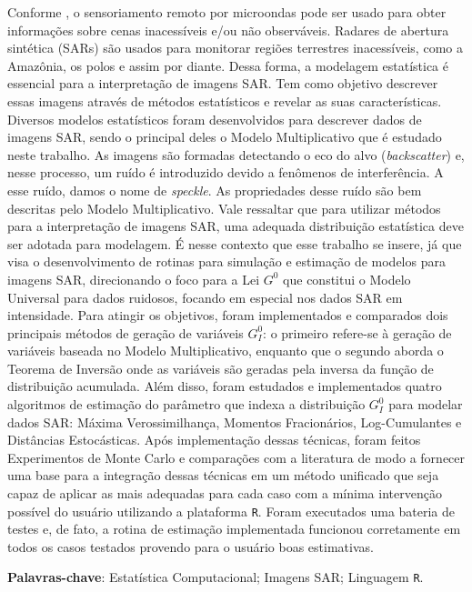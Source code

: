 \documentclass[tcc]{ic}
\begin{document}
\begin{agradecimentos}
\begin{resumo}
Conforme \citet{FreryMinute2004}, o sensoriamento remoto por microondas pode ser usado para obter informações sobre cenas inacessíveis e/ou não observáveis. Radares de abertura sintética (SARs) são usados para monitorar regiões terrestres inacessíveis, como a Amazônia, os polos e assim por diante.
%
Dessa forma, a modelagem estatística é essencial para a interpretação de imagens SAR. Tem como objetivo descrever essas imagens através de métodos estatísticos e revelar as suas características. Diversos modelos estatísticos foram desenvolvidos para descrever dados de imagens SAR, sendo o principal deles o Modelo Multiplicativo que é estudado neste trabalho. As imagens são formadas detectando o eco do alvo (\textit{backscatter}) e, nesse processo, um ruído é introduzido devido a fenômenos de interferência. A esse ruído, damos o nome de \textit{speckle}. As propriedades desse ruído são bem descritas pelo Modelo Multiplicativo.
%
Vale ressaltar que para utilizar métodos para a interpretação de imagens SAR, uma adequada distribuição estatística deve ser adotada para modelagem. É nesse contexto que esse trabalho se insere, já que visa o desenvolvimento de rotinas para simulação e estimação de modelos para imagens SAR, direcionando o foco para a Lei $G^{0}$ que constitui o Modelo Universal para dados ruidosos, focando em especial nos dados SAR em intensidade.  
%
Para atingir os objetivos, foram implementados e comparados dois principais métodos de geração de variáveis $G_I^{0}$: o primeiro refere-se à geração de variáveis baseada no Modelo Multiplicativo, enquanto que o segundo aborda o Teorema de Inversão onde as variáveis são geradas pela inversa da função de distribuição acumulada. Além disso, foram estudados e implementados quatro algoritmos de estimação do parâmetro que indexa a distribuição $G_I^{0}$ para modelar dados SAR: Máxima Verossimilhança, Momentos Fracionários, Log-Cumulantes e Distâncias Estocásticas.
%
Após implementação dessas técnicas, foram feitos Experimentos de Monte Carlo e comparações com a literatura de modo a fornecer uma base para a integração dessas técnicas em um método unificado que seja capaz de aplicar as mais adequadas para cada caso com a mínima intervenção possível do usuário utilizando a plataforma \texttt{R}. Foram executados uma bateria de testes e, de fato, a rotina de estimação implementada funcionou corretamente em todos os casos testados provendo para o usuário boas estimativas.

\vspace{2em}
\textbf{Palavras-chave}: Estatística Computacional; Imagens SAR; Linguagem \texttt R.


\end{resumo}
\end{agradecimentos}
\end{document}
